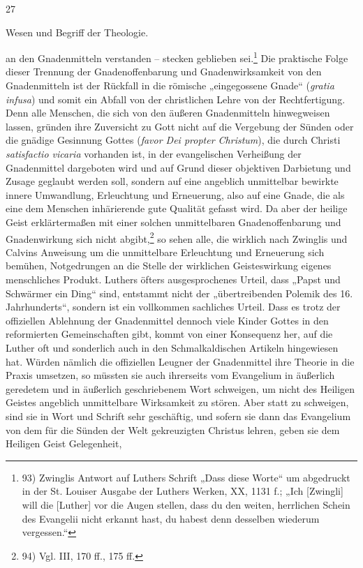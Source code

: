\hfill 27 \\ \centerline{Wesen und Begriff der Theologie.}\par an den Gnadenmitteln verstanden – stecken geblieben sei.\footnote{93) Zwinglis Antwort auf Luthers Schrift „Dass diese Worte“ um abgedruckt in der St. Louiser Ausgabe der Luthers Werken, XX, 1131 f.; „Ich [Zwingli] will die [Luther] vor die Augen stellen, dass du den weiten, herrlichen Schein des Evangelii nicht erkannt hast, du habest denn desselben wiederum vergessen.“} Die praktische Folge dieser Trennung der Gnadenoffenbarung und Gnadenwirksamkeit von den Gnadenmitteln ist der Rückfall in die römische „eingegossene Gnade“ (\emph{gratia infusa}) und somit ein Abfall von der christlichen Lehre von der Rechtfertigung. Denn alle Menschen, die sich von den äußeren Gnadenmitteln hinwegweisen lassen, gründen ihre Zuversicht zu Gott nicht auf die Vergebung der Sünden oder die gnädige Gesinnung Gottes (\emph{favor Dei propter Christum}), die durch Christi \emph{satisfactio vicaria} vorhanden ist, in der evangelischen Verheißung der Gnadenmittel dargeboten wird und auf Grund dieser objektiven Darbietung und Zusage geglaubt werden soll, sondern auf eine angeblich unmittelbar bewirkte innere Umwandlung, Erleuchtung und Erneuerung, also auf eine Gnade, die als eine dem Menschen inhärierende gute Qualität gefasst wird. Da aber der heilige Geist erklärtermaßen mit einer solchen unmittelbaren Gnadenoffenbarung und Gnadenwirkung sich nicht abgibt,\footnote{94) Vgl. III, 170 ff., 175 ff.} so sehen alle, die wirklich nach Zwinglis und Calvins Anweisung um die unmittelbare Erleuchtung und Erneuerung sich bemühen, Notgedrungen an die Stelle der wirklichen Geisteswirkung eigenes menschliches Produkt. Luthers öfters ausgesprochenes Urteil, dass „Papst und Schwärmer ein Ding“ sind, entstammt nicht der „übertreibenden Polemik des 16. Jahrhunderts“, sondern ist ein vollkommen sachliches Urteil. Dass es trotz der offiziellen Ablehnung der Gnadenmittel dennoch viele Kinder Gottes in den reformierten Gemeinschaften gibt, kommt von einer Konsequenz her, auf die Luther oft und sonderlich auch in den Schmalkaldischen Artikeln hingewiesen hat. Würden nämlich die offiziellen Leugner der Gnadenmittel ihre Theorie in die Praxis umsetzen, so müssten sie auch ihrerseits vom Evangelium in äußerlich geredetem und in äußerlich geschriebenem Wort schweigen, um nicht des Heiligen Geistes angeblich unmittelbare Wirksamkeit zu stören. Aber statt zu schweigen, sind sie in Wort und Schrift sehr geschäftig, und sofern sie dann das Evangelium von dem für die Sünden der Welt gekreuzigten Christus lehren, geben sie dem Heiligen Geist Gelegenheit,